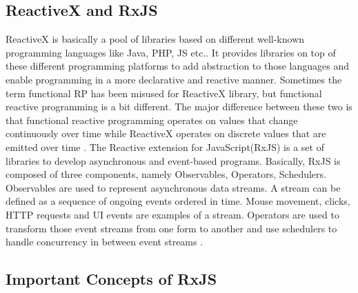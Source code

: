 \subsection{ReactiveX and RxJS}
ReactiveX is basically a pool of libraries based on different well-known programming languages like Java, PHP, JS etc.. It provides libraries on top of these different programming platforms to add abstraction to those languages and enable programming in a more declarative and reactive manner. Sometimes the term functional RP has been misused for ReactiveX library, but functional reactive programming is a bit different. The major difference between these two is that functional reactive programming operates on values that change continuously over time while ReactiveX operates on discrete values that are emitted over time \cite{reactivex}. 
The Reactive extension for JavaScript(RxJS) is a set of libraries to develop asynchronous and event-based programs. Basically, RxJS is composed of three components, namely Observables, Operators, Schedulers. Observables are used to represent asynchronous data streams. A stream can be defined as a sequence of ongoing events ordered in time. Mouse movement, clicks, HTTP requests and UI events are examples of a stream. Operators are used to transform those event streams from one form to another and use schedulers to
handle concurrency in between event streams \cite{rxjs}.

\subsection{Important Concepts of RxJS}
